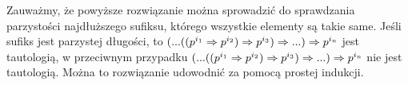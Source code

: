 Zauważmy, że powyższe rozwiązanie można sprowadzić do sprawdzania parzystości najdłuższego sufiksu, którego wszystkie elementy są takie same. Jeśli sufiks jest parzystej długości, to $(... (( p^{i_1} \Rightarrow p^{i_2} ) \Rightarrow p^{i_3}) \Rightarrow ...) \Rightarrow p^{i_n}$ jest tautologią, w przeciwnym przypadku $(... (( p^{i_1} \Rightarrow p^{i_2} ) \Rightarrow p^{i_3}) \Rightarrow ...) \Rightarrow p^{i_n}$ nie jest tautologią. Można to rozwiązanie udowodnić za pomocą prostej indukcji.